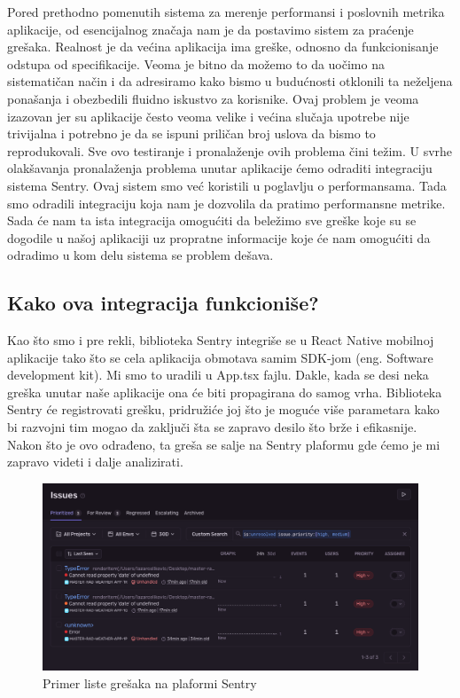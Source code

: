 \documentclass[12pt,oneside]{memoir}
\begin{document}
Pored prethodno pomenutih sistema za merenje performansi i poslovnih metrika aplikacije, od esencijalnog značaja nam je da postavimo sistem za praćenje grešaka. Realnost je da većina aplikacija ima greške, odnosno da funkcionisanje odstupa od specifikacije. Veoma je bitno da možemo to da uočimo na sistematičan način i da adresiramo kako bismo u budućnosti otklonili ta neželjena ponašanja i obezbedili fluidno iskustvo za korisnike. Ovaj problem je veoma izazovan jer su aplikacije često veoma velike i većina slučaja upotrebe nije trivijalna i potrebno je da se ispuni priličan broj uslova da bismo to reprodukovali. Sve ovo testiranje i pronalaženje ovih problema čini težim. U svrhe olakšavanja pronalaženja problema unutar aplikacije ćemo odraditi integraciju sistema Sentry. Ovaj sistem smo već koristili u poglavlju o performansama. Tada smo odradili integraciju koja nam je dozvolila da pratimo performansne metrike. Sada će nam ta ista integracija omogućiti da beležimo sve greške koje su se dogodile u našoj aplikaciji uz propratne informacije koje će nam omogućiti da odradimo u kom delu sistema se problem dešava.

\subsection{Kako ova integracija funkcioniše?}

Kao što smo i pre rekli, biblioteka Sentry integriše se u React Native mobilnoj aplikacije tako što se cela aplikacija obmotava samim SDK-jom (eng. Software development kit). Mi smo to uradili u App.tsx fajlu. Dakle, kada se desi neka greška unutar naše aplikacije ona će biti propagirana do samog vrha. Biblioteka Sentry će registrovati grešku, pridružiće joj što je moguće više parametara kako bi razvojni tim mogao da zaključi šta se zapravo desilo što brže i efikasnije. Nakon što je ovo odrađeno, ta greša se salje na Sentry plaformu gde ćemo je mi zapravo videti i dalje analizirati.

\begin{figure}[h!]
\centering
\includegraphics[scale=0.4]{docs/images/chapterSeven/sentryErrorLogs.png}
\caption{Primer liste grešaka na plaformi Sentry}
\label{fig:sentryErrorList}
\end{figure}
\end{document}
